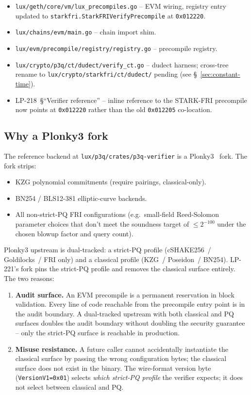 \begin{itemize}[leftmargin=2em,nosep]
\item \texttt{lux/geth/core/vm/lux\_precompiles.go} -- EVM wiring,
  registry entry updated to
  \texttt{starkfri.StarkFRIVerifyPrecompile} at \texttt{0x012220}.
\item \texttt{lux/chains/evm/main.go} -- chain import shim.
\item \texttt{lux/evm/precompile/registry/registry.go} --
  precompile registry.
\item \texttt{lux/crypto/p3q/ct/dudect/verify\_ct.go} -- dudect
  harness; cross-tree rename to
  \texttt{lux/crypto/starkfri/ct/dudect/} pending (see
  \S~\ref{sec:constant-time}).
\item LP-218~\S``Verifier reference'' -- inline reference to the
  STARK-FRI precompile now points at \texttt{0x012220} rather than
  the old \texttt{0x012205} co-location.
\end{itemize}

\subsection{Why a Plonky3 fork}

The reference backend at \texttt{lux/p3q/crates/p3q-verifier} is a
Plonky3~\cite{plonky3} fork. The fork strips:

\begin{itemize}[leftmargin=2em,nosep]
\item KZG polynomial commitments (require pairings, classical-only).
\item BN254 / BLS12-381 elliptic-curve backends.
\item All non-strict-PQ FRI configurations (e.g.\ small-field
  Reed-Solomon parameter choices that don't meet the soundness
  target of $\le 2^{-100}$ under the chosen blowup factor and query
  count).
\end{itemize}

Plonky3 upstream is dual-tracked: a strict-PQ profile (cSHAKE256~/
Goldilocks~/ FRI only) and a classical profile (KZG~/ Poseidon~/
BN254). LP-221's fork pins the strict-PQ profile and removes the
classical surface entirely. The two reasons:

\begin{enumerate}[leftmargin=2em,nosep]
\item \textbf{Audit surface.} An EVM precompile is a permanent
  reservation in block validation. Every line of code reachable
  from the precompile entry point is in the audit boundary. A
  dual-tracked upstream with both classical and PQ surfaces
  doubles the audit boundary without doubling the security
  guarantee -- only the strict-PQ surface is reachable in
  production.
\item \textbf{Misuse resistance.} A future caller cannot
  accidentally instantiate the classical surface by passing the
  wrong configuration bytes; the classical surface does not exist
  in the binary. The wire-format version byte
  (\texttt{VersionV1=0x01}) selects \emph{which strict-PQ profile}
  the verifier expects; it does not select between classical and
  PQ.
\end{enumerate}

